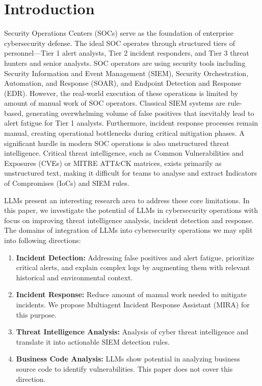 \documentclass[conference]{IEEEtran}
\begin{document}
\section{Introduction}
Security Operations Centers (SOCs) serve as the foundation of enterprise cybersecurity defense. 
The ideal SOC operates through structured tiers of personnel—Tier 1 alert analysts, Tier 2 incident responders, and Tier 3 threat hunters and senior analysts. 
SOC operators are using security tools including Security Information and Event Management (SIEM), 
Security Orchestration, Automation, and Response (SOAR), and Endpoint Detection and Response (EDR). 
However, the real-world execution of these operations is limited by amount of manual work of SOC operators. 
Classical SIEM systems are rule-based, generating overwhelming volume of false positives that inevitably lead to alert fatigue for Tier 1 analysts. 
Furthermore, incident response processes remain manual, creating operational bottlenecks during critical mitigation phases. 
A significant hurdle in modern SOC operations is also unstructured threat intelligence. 
Critical threat intelligence, such as Common Vulnerabilities and Exposures (CVEs) or MITRE ATT\&CK matrices, exists primarily as unstructured text, making it difficult for teams to analyse and extract Indicators of Compromises (IoCs) and SIEM rules. 

LLMs present an interesting research area to address these core limitations. In this paper, we investigate the potential of LLMs in cybersecurity operations with focus on improving threat intelligence analysis, incident detection and response. 
The domains of integration of LLMs into cybersecurity operations we may split into following directions:
\begin{enumerate}
    \item \textbf{Incident Detection:} Addressing false positives and alert fatigue, prioritize critical alerts, and explain complex logs by augmenting them with relevant historical and environmental context.
    \item \textbf{Incident Response:} Reduce amount of manual work needed to mitigate incidents. We propose Multiagent Incident Response Assistant (MIRA) for this purpose.
    \item \textbf{Threat Intelligence Analysis:} Analysis of cyber threat intelligence and translate it into actionable SIEM detection rules.
    \item \textbf{Business Code Analysis:} LLMs show potential in analyzing business source code to identify vulnerabilities. This paper does not cover this direction. 
\end{enumerate}
\end{document}
